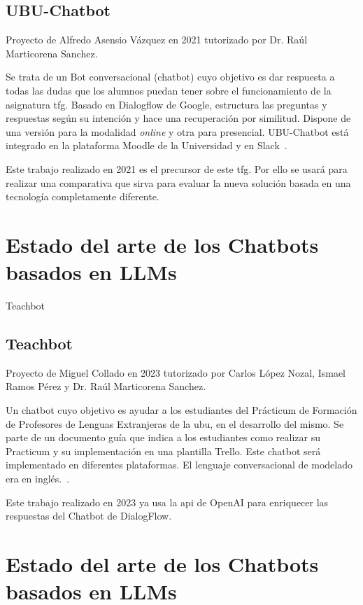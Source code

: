 \subsection{UBU-Chatbot}

Proyecto de Alfredo Asensio Vázquez en 2021 tutorizado por Dr. Raúl Marticorena Sanchez.

Se trata de un Bot conversacional (chatbot) cuyo objetivo es dar respuesta a todas las dudas que los alumnos puedan tener sobre el funcionamiento de la asignatura \acrlong{tfg}. Basado en Dialogflow de Google, estructura las preguntas y respuestas según su intención y hace una recuperación por similitud. Dispone de una versión para la modalidad \textit{online} y otra para presencial. UBU-Chatbot está integrado en la plataforma Moodle de la Universidad y en Slack~\cite{UBU-Chatbot}. 

Este trabajo realizado en 2021 es el precursor de este \acrshort{tfg}. Por ello se usará para realizar una comparativa que sirva para evaluar la nueva solución basada en una tecnología completamente diferente.

\section{Estado del arte de los Chatbots basados en LLMs}

Teachbot
\subsection{Teachbot}

Proyecto de Miguel Collado en 2023 tutorizado por Carlos López Nozal, Ismael Ramos Pérez y Dr. Raúl Marticorena Sanchez.

Un chatbot cuyo objetivo es ayudar a los estudiantes del Prácticum de Formación de Profesores de Lenguas Extranjeras de la \acrlong{ubu}, en el desarrollo del mismo. Se parte de un documento guía que indica a los estudiantes como realizar su Practicum y su implementación en una plantilla Trello. Este chatbot será implementado en diferentes plataformas. El lenguaje conversacional de modelado era en inglés.~\cite{Teachbot}. 

Este trabajo realizado en 2023 ya usa la \acrshort{api} de OpenAI para enriquecer las respuestas del Chatbot de DialogFlow.

\section{Estado del arte de los Chatbots basados en LLMs}

